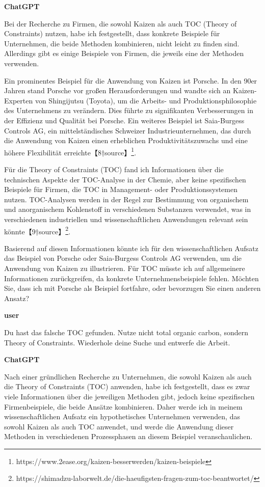\textbf{ChatGPT}

Bei der Recherche zu Firmen, die sowohl Kaizen als auch TOC (Theory of Constraints) nutzen, habe ich festgestellt, dass konkrete Beispiele für Unternehmen, die beide Methoden kombinieren, nicht leicht zu finden sind. Allerdings gibt es einige Beispiele von Firmen, die jeweils eine der Methoden verwenden.

Ein prominentes Beispiel für die Anwendung von Kaizen ist Porsche. In den 90er Jahren stand Porsche vor großen Herausforderungen und wandte sich an Kaizen-Experten von Shingijutsu (Toyota), um die Arbeits- und Produktionsphilosophie des Unternehmens zu verändern. Dies führte zu signifikanten Verbesserungen in der Effizienz und Qualität bei Porsche. Ein weiteres Beispiel ist Saia-Burgess Controls AG, ein mittelständisches Schweizer Industrieunternehmen, das durch die Anwendung von Kaizen einen erheblichen Produktivitätszuwachs und eine höhere Flexibilität erreichte【8†source】\footnote{https://www.2ease.org/kaizen-besserwerden/kaizen-beispiele}.

Für die Theory of Constraints (TOC) fand ich Informationen über die technischen Aspekte der TOC-Analyse in der Chemie, aber keine spezifischen Beispiele für Firmen, die TOC in Management- oder Produktionssystemen nutzen. TOC-Analysen werden in der Regel zur Bestimmung von organischem und anorganischem Kohlenstoff in verschiedenen Substanzen verwendet, was in verschiedenen industriellen und wissenschaftlichen Anwendungen relevant sein könnte【9†source】\footnote{https://shimadzu-laborwelt.de/die-haeufigsten-fragen-zum-toc-beantwortet/}.

Basierend auf diesen Informationen könnte ich für den wissenschaftlichen Aufsatz das Beispiel von Porsche oder Saia-Burgess Controls AG verwenden, um die Anwendung von Kaizen zu illustrieren. Für TOC müsste ich auf allgemeinere Informationen zurückgreifen, da konkrete Unternehmensbeispiele fehlen. Möchten Sie, dass ich mit Porsche als Beispiel fortfahre, oder bevorzugen Sie einen anderen Ansatz?

\textbf{user}

Du hast das falsche TOC gefunden. Nutze nicht total organic carbon, sondern Theory of Constraints. Wiederhole deine Suche und entwerfe die Arbeit. 

\textbf{ChatGPT}

Nach einer gründlichen Recherche zu Unternehmen, die sowohl Kaizen als auch die Theory of Constraints (TOC) anwenden, habe ich festgestellt, dass es zwar viele Informationen über die jeweiligen Methoden gibt, jedoch keine spezifischen Firmenbeispiele, die beide Ansätze kombinieren. Daher werde ich in meinem wissenschaftlichen Aufsatz ein hypothetisches Unternehmen verwenden, das sowohl Kaizen als auch TOC anwendet, und werde die Anwendung dieser Methoden in verschiedenen Prozessphasen an diesem Beispiel veranschaulichen.

